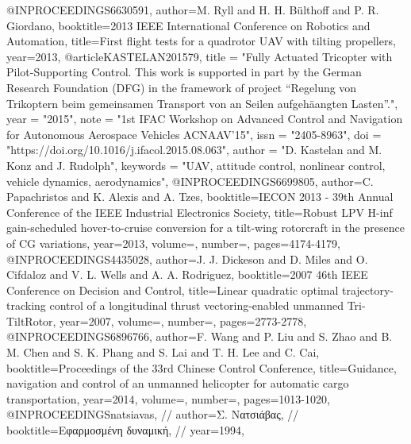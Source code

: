 @INPROCEEDINGS{6630591,
    author={M. {Ryll} and H. H. {Bülthoff} and P. R. {Giordano}},
    booktitle={2013 IEEE International Conference on Robotics and Automation},
    title={First flight tests for a quadrotor UAV with tilting propellers},
    year={2013},
}
@article{KASTELAN201579,
    title = "Fully Actuated Tricopter with Pilot-Supporting Control. This work is supported in part by the German Research Foundation (DFG) in the framework of project “Regelung von Trikoptern beim gemeinsamen Transport von an Seilen aufgehäangten Lasten”.",
    year = "2015",
    note = "1st IFAC Workshop on Advanced Control and Navigation for Autonomous Aerospace Vehicles ACNAAV’15",
    issn = "2405-8963",
    doi = "https://doi.org/10.1016/j.ifacol.2015.08.063",
    author = "D. Kastelan and M. Konz and J. Rudolph",
    keywords = "UAV, attitude control, nonlinear control, vehicle dynamics, aerodynamics",
}
@INPROCEEDINGS{6699805,
    author={C. {Papachristos} and K. {Alexis} and A. {Tzes}},
    booktitle={IECON 2013 - 39th Annual Conference of the IEEE Industrial Electronics Society}, 
    title={Robust LPV H-inf gain-scheduled hover-to-cruise conversion for a tilt-wing rotorcraft in the presence of CG variations}, 
    year={2013},
    volume={},
    number={},
    pages={4174-4179},
}
@INPROCEEDINGS{4435028,
    author={J. J. {Dickeson} and D. {Miles} and O. {Cifdaloz} and V. L. {Wells} and A. A. {Rodriguez}},
    booktitle={2007 46th IEEE Conference on Decision and Control}, 
    title={Linear quadratic optimal trajectory-tracking control of a longitudinal thrust vectoring-enabled unmanned Tri-TiltRotor}, 
    year={2007},
    volume={},
    number={},
    pages={2773-2778},}
@INPROCEEDINGS{6896766,
    author={F. {Wang} and P. {Liu} and S. {Zhao} and B. M. {Chen} and S. K. {Phang} and S. {Lai} and T. H. {Lee} and C. {Cai}},
    booktitle={Proceedings of the 33rd Chinese Control Conference}, 
    title={Guidance, navigation and control of an unmanned helicopter for automatic cargo transportation}, 
    year={2014},
    volume={},
    number={},
    pages={1013-1020},}
    @INPROCEEDINGS{natsiavas,
//     author={Σ. Νατσιάβας},
//     booktitle={Εφαρμοσμένη δυναμική}, 
//     year={1994},}